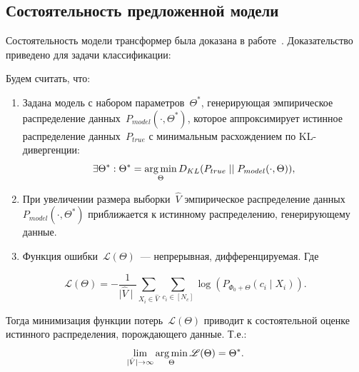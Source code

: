 \subsection{Состоятельность предложенной модели}
Состоятельность модели трансформер была доказана в работе~\cite{lee2023mathematical}. Доказательство приведено для задачи классификации:
\begin{theorem}
\label{theorem:1}
Будем считать, что: 
\begin{enumerate}
    \item Задана модель с набором параметров~$\Theta^*$, генерирующая эмпирическое распределение данных~$P_{model}(\cdot, \Theta^*)$, которое аппроксимирует истинное распределение данных~$P_{true}$ с минимальным расхождением по KL-дивергенции: 
    \begin{equation}
    \label{eq:1}
    \exists \Theta^*: \Theta^* = \operatorname*{arg\,min} _\Theta D_{KL}(P_{true} \mid\mid P_{model}(\cdot, \Theta)),
    \end{equation}
     \item При увеличении размера выборки~$\hat{V}$ эмпирическое распределение данных $P_{model}(\cdot, \Theta^*)$ приближается к истинному распределению, генерирующему данные.
     \item Функция ошибки~$\mathscr{L}(\Theta)$~--- непрерывная, дифференцируемая. Где
\end{enumerate}
\begin{equation}
\label{eq:2.1}
\mathscr{L}(\Theta) = -\frac{1}{\mid \hat{V} \mid}\sum_{X_i \in \hat{V}} \sum_{c_i \in [N_c]} \log \left(P_{\Phi_0+\Theta}\left(c_i \mid X_i\right)\right).
\end{equation}

Тогда минимизация функции потерь~$\mathscr{L}(\Theta)$ приводит к состоятельной оценке истинного распределения, порождающего данные. Т.е.: 
\begin{equation}
\label{eq:2.2}
    \lim_{\mid\hat{V}\mid\to\infty} \operatorname*{arg\,min} _\Theta \mathscr{L}(\Theta) = \Theta^*.
\end{equation}

\end{theorem}
\renewcommand\qedsymbol{$\blacksquare$}
